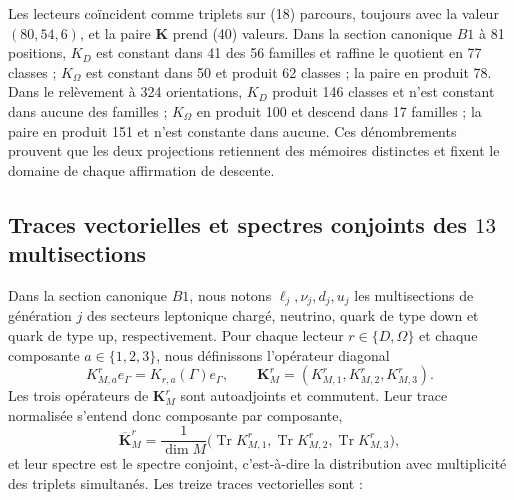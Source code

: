 Les lecteurs coïncident comme triplets sur (18) parcours, toujours avec la valeur
\((80,54,6)\), et la paire \(\mathbf K\) prend (40) valeurs. Dans la section
canonique \(B1\) à 81 positions, \(K_D\) est constant dans 41 des 56
familles et raffine le quotient en 77 classes ; \(K_\Omega\) est constant dans 50
et produit 62 classes ; la paire en produit 78. Dans le relèvement à 324
orientations, \(K_D\) produit 146 classes et n'est constant dans aucune des
familles ; \(K_\Omega\) en produit 100 et descend dans 17 familles ; la paire en produit
151 et n'est constante dans aucune. Ces dénombrements prouvent que les deux
projections retiennent des mémoires distinctes et fixent le domaine de chaque
affirmation de descente.

\subsection{Traces vectorielles et spectres conjoints des \(13\) multisections}

Dans la section canonique \(B1\), nous notons
\(\ell_j,\nu_j,d_j,u_j\) les multisections de génération \(j\) des
secteurs leptonique chargé, neutrino, quark de type down et quark de type
up, respectivement. Pour chaque lecteur
\(r\in\{D,\Omega\}\) et chaque composante \(a\in\{1,2,3\}\), nous définissons
l'opérateur diagonal
\[
 K_{M,a}^r e_\Gamma=K_{r,a}(\Gamma)e_\Gamma,
 \qquad
 \mathbf K_M^r=(K_{M,1}^r,K_{M,2}^r,K_{M,3}^r).
\]
Les trois opérateurs de \(\mathbf K_M^r\) sont autoadjoints et commutent. Leur
trace normalisée s'entend donc composante par composante,
\[
 \overline{\mathbf K}_M^r
 =\frac{1}{\dim M}
 \bigl(\operatorname{Tr}K_{M,1}^r,
       \operatorname{Tr}K_{M,2}^r,
       \operatorname{Tr}K_{M,3}^r\bigr),
\]
et leur spectre est le spectre conjoint, c'est-à-dire la distribution avec
multiplicité des triplets simultanés. Les treize traces vectorielles sont :

